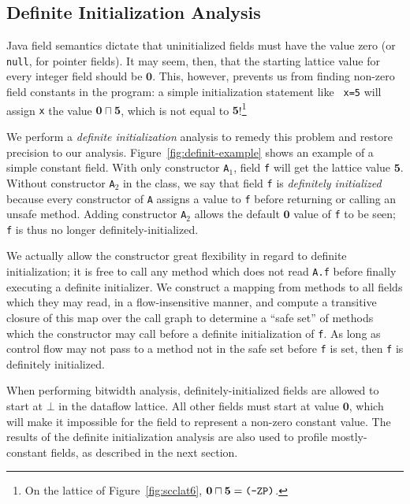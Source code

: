 \documentclass{acmconf}
\newcommand{\meet}{\ensuremath{\sqcap}}
\begin{document}
\subsection{Definite Initialization Analysis}
Java field semantics dictate that uninitialized fields must have
the value zero (or {\tt null}, for pointer fields).  It may seem,
then, that the starting lattice value for every integer field should
be $\mathbf{0}$.  This, however, prevents us from finding non-zero field
constants in the program: a simple initialization statement like {\tt
  x=5} will assign {\tt x} the value $\mathbf{0}\meet\mathbf{5}$,
which is not equal to $\mathbf{5}$!\footnote{On the lattice of
  Figure~\ref{fig:scclat6}, $\mathbf{0}\meet\mathbf{5}=\text{\tt
    (-ZP)}$.}

We perform a {\it definite initialization} analysis to remedy this
problem and restore precision to our analysis.
Figure~\ref{fig:definit-example} shows an example of a simple
constant field.
With only constructor {\tt A$_1$}, field {\tt f} will get the
lattice value $\mathbf{5}$.  Without constructor {\tt A$_2$} in the class,
we say that field {\tt f} is {\it definitely initialized} because
every constructor of {\tt A} assigns a value to {\tt f} before
returning or calling an unsafe method.
Adding constructor {\tt A$_2$} allows the
default $\mathbf{0}$ value of {\tt f} to be seen; {\tt f} is thus no longer
definitely-initialized.

We actually allow the constructor great flexibility in regard to
definite initialization; it is free to call any method which does not
read {\tt A.f} before finally executing a definite initializer.
We construct a mapping from methods to all
fields which they may read, in a flow-insensitive manner, and compute
a transitive closure of this map over the call graph to determine 
a ``safe set'' of
methods which the constructor may call before a definite
initialization of {\tt f}.  As long as control flow may not pass to a
method not in the safe set before {\tt f} is set, then {\tt f} is
definitely initialized.

When performing bitwidth analysis,
definitely-initialized fields are allowed to start at $\bot$ in the
dataflow lattice.  All other fields must start at value
$\mathbf{0}$, which will make it impossible for the field to represent a
non-zero constant value.  The results of the definite initialization
analysis are also used to profile mostly-constant fields, as described
in the next section.
\end{document}
